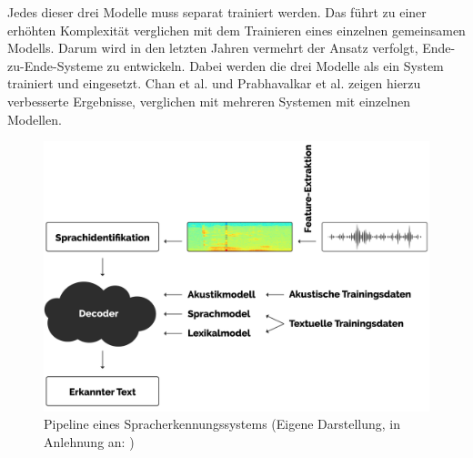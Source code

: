 Jedes dieser drei Modelle muss separat trainiert werden. Das führt zu einer erhöhten Komplexität verglichen mit dem Trainieren eines einzelnen gemeinsamen Modells.
Darum wird in den letzten Jahren vermehrt der Ansatz verfolgt, Ende-zu-Ende-Systeme zu entwickeln. Dabei werden die drei Modelle als ein System trainiert und eingesetzt.
Chan et al. \cite{Chan.2015} und Prabhavalkar et al. \cite{Prabhavalkar.2017} zeigen hierzu verbesserte Ergebnisse, verglichen mit mehreren Systemen mit einzelnen Modellen.

\begin{figure}[h!]
    \centering
    \includegraphics[width=1\linewidth]{images/pipeline}
    \caption{Pipeline eines Spracherkennungssystems (Eigene Darstellung, in Anlehnung an: \cite{Tom.2016}) }%
    \label{fig:pipeline}
\end{figure}